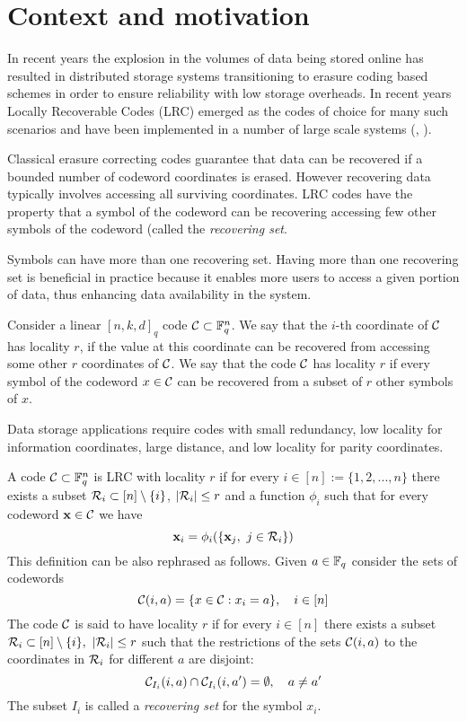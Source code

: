 \chapter{Context and motivation}

In recent years the explosion in the volumes of data being stored online has resulted in distributed storage systems transitioning to erasure coding based schemes in order to ensure reliability with low storage overheads. In recent years Locally Recoverable Codes (LRC) emerged as the codes of choice for many such scenarios and have been implemented in a number of large scale systems (\cite{azure}, \cite{hadoop}).

Classical erasure correcting codes guarantee that data can be recovered if a bounded number of codeword coordinates is erased. However recovering data typically involves accessing all surviving coordinates. LRC codes have the property that a symbol of the codeword can be recovering accessing few other symbols of the codeword (called the \textit{recovering set}.

Symbols can have more than one recovering set. Having more than one recovering set is beneficial in practice because it enables more users to access a given portion of data, thus enhancing data availability in the system.

Consider a linear $[n,k,d]_q$ code ${\mathcal C} \subset {\mathbb F}_q^n$. We say that the $i$-th coordinate of ${\mathcal C}$ has locality $r$, if the value at this coordinate can be recovered from accessing some other $r$ coordinates of ${\mathcal C}$. We say that the code ${\mathcal C}$ has locality $r$ if every symbol of the codeword $x \in {\mathcal C}$ can be recovered from a subset of $r$ other symbols of $x$.

Data storage applications require codes with small redundancy, low locality for information coordinates, large distance, and low locality for parity coordinates.


\begin{defn}
A code ${\mathcal C} \subset {\mathbb F}_q^n$ is LRC with locality $r$ if for every $i \in [n] := \{1,2,...,n\}$ there exists a subset ${\mathcal R}_i \subset [n] \setminus \{i\}$, $\left\vert {{\mathcal R}_i} \right\vert \leq r$ and a function $\phi_i$ such that for every codeword $\mathbf{x} \in {\mathcal C}$ we have
\begin{equation}
\x_i = \phi_i(\{\x_j, \ j \in \R_i \})
\end{equation}
This definition can be also rephrased as follows. Given $a \in {\mathbb F}_q$ consider the sets of codewords
\[{\mathcal C}(i,a) = \{ x \in {\mathcal C} : x_i = a\}, \quad i \in [n]\]
The code ${\mathcal C}$ is said to have locality $r$ if for every $i \in [n]$ there exists a subset ${\mathcal R}_i \subset [n] \setminus \{i\}, \ \left\vert {{\mathcal R}_i} \right\vert \leq r$ such that the restrictions of the sets ${\mathcal C}(i,a)$ to the coordinates in ${\mathcal R}_i$ for different $a$ are disjoint:
    \begin{equation}
        {\mathcal C}_{I_i}(i,a) \cap {\mathcal C}_{I_i}(i,a') = \emptyset, \quad a \neq a'
    \end{equation}
The subset $I_i$ is called a \textit{recovering set} for the symbol $x_i$.
\end{defn}

